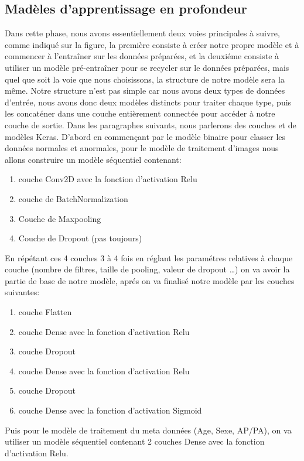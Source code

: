 \subsection{Madèles d'apprentissage en profondeur}
Dans cette phase, nous avons essentiellement deux voies principales à suivre, comme indiqué sur la figure, la première consiste à créer notre propre modèle et à commencer à l'entraîner sur les données préparées, et la deuxiéme consiste à utiliser un modèle pré-entraîner pour se recycler sur le données préparées, mais quel que soit la voie que nous choisissons, la structure de notre modèle sera la même.
Notre structure n'est pas simple car nous avons deux types de données d'entrée, nous avons donc deux modèles distincts pour traiter chaque type, puis les concaténer dans une couche entièrement connectée pour accéder à notre couche de sortie.
Dans les paragraphes suivants, nous parlerons des couches et de modèles Keras.
D’abord en commençant par le modèle binaire pour classer les données normales et anormales, pour le modèle de traitement d'images nous allons construire un modèle séquentiel contenant:
\begin{enumerate}
    \item couche Conv2D avec la fonction d'activation Relu
    \item couche de BatchNormalization
    \item Couche de Maxpooling
    \item Couche de Dropout (pas toujours)
\end{enumerate}
En répétant ces 4 couches 3 à 4 fois en réglant les paramétres relatives à chaque couche (nombre de filtres, taille de pooling, valeur de dropout …) on va avoir la partie de base de notre modèle, aprés on va finalisé notre modèle par les couches suivantes:
\begin{enumerate}
    \item couche Flatten
    \item couche Dense avec la fonction d'activation Relu
    \item couche Dropout
    \item couche Dense avec la fonction d'activation Relu
    \item couche Dropout
    \item couche Dense avec la fonction d'activation Sigmoid
\end{enumerate}

Puis pour le modèle de traitement du meta données (Age, Sexe, AP/PA), on va utiliser un modèle séquentiel contenant 2 couches Dense avec la fonction d’activation Relu.

